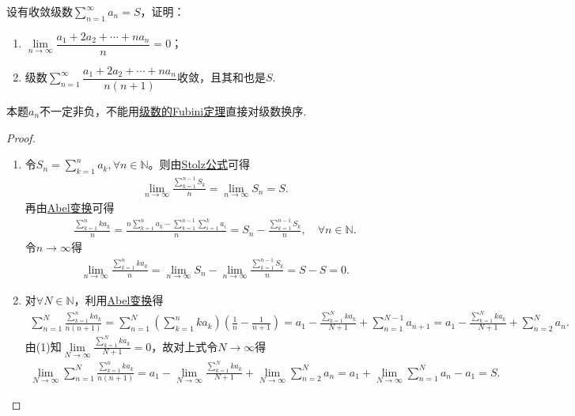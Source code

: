\documentclass[../../main.tex]{subfiles}%
\begin{document}
\begin{example}
设有收敛级数$\sum\limits_{n=1}^{\infty} a_n = S$，证明：
\begin{enumerate}[(1)]
\item $\lim\limits_{n\to\infty} \dfrac{a_1 + 2a_2 + \cdots + na_n}{n} = 0$；
\item 级数$\sum\limits_{n=1}^{\infty} \dfrac{a_1 + 2a_2 + \cdots + na_n}{n(n+1)}$收敛，且其和也是$S$.
\end{enumerate}
\end{example}
\begin{note}
本题$a_n$不一定非负，不能用\hyperref[theorem:级数的Fubini定理]{级数的Fubini定理}直接对级数换序.
\end{note}
\begin{proof}
\begin{enumerate}[(1)]
\item 令$S_n = \sum\limits_{k=1}^n a_k, \forall n\in\mathbb{N}$。则由\hyperref[theorem:Stolz定理]{Stolz公式}可得
\begin{align*}
\lim_{n\to\infty} \frac{\sum\limits_{k=1}^{n-1} S_k}{n} = \lim_{n\to\infty} S_n = S.
\end{align*}
再由\hyperref[theorem:Abel变换]{Abel变换}可得
\begin{align*}
\frac{\sum\limits_{k=1}^n ka_k}{n} = \frac{n\sum\limits_{k=1}^n a_k - \sum\limits_{k=1}^{n-1} \sum\limits_{i=1}^k a_i}{n} = S_n - \frac{\sum\limits_{k=1}^{n-1} S_k}{n}, \quad \forall n\in\mathbb{N}.
\end{align*}
令$n\to\infty$得
\begin{align*}
\lim_{n\to\infty} \frac{\sum\limits_{k=1}^n ka_k}{n} = \lim_{n\to\infty} S_n - \lim_{n\to\infty} \frac{\sum\limits_{k=1}^{n-1} S_k}{n} = S - S = 0.
\end{align*}

\item 对$\forall N\in\mathbb{N}$，利用\hyperref[theorem:Abel变换]{Abel变换}得
\begin{align*}
\sum_{n=1}^N \frac{\sum\limits_{k=1}^n ka_k}{n(n+1)}
= \sum_{n=1}^N \left( \sum_{k=1}^n ka_k \right) \left( \frac{1}{n} - \frac{1}{n+1} \right) 
= a_1 - \frac{\sum\limits_{k=1}^N ka_k}{N+1} + \sum_{n=1}^{N-1} a_{n+1} 
= a_1 - \frac{\sum\limits_{k=1}^N ka_k}{N+1} + \sum_{n=2}^N a_n.
\end{align*}
由(1)知$\lim\limits_{N\to\infty} \frac{\sum\limits_{k=1}^N ka_k}{N+1} = 0$，故对上式令$N\to\infty$得
\begin{align*}
\lim_{N\to\infty} \sum_{n=1}^N \frac{\sum\limits_{k=1}^n ka_k}{n(n+1)}
= a_1 - \lim_{N\to\infty} \frac{\sum\limits_{k=1}^N ka_k}{N+1} + \lim_{N\to\infty} \sum_{n=2}^N a_n 
= a_1 + \lim_{N\to\infty} \sum_{n=1}^N a_n - a_1 = S.
\end{align*}
\end{enumerate}

\end{proof}
\end{document}
